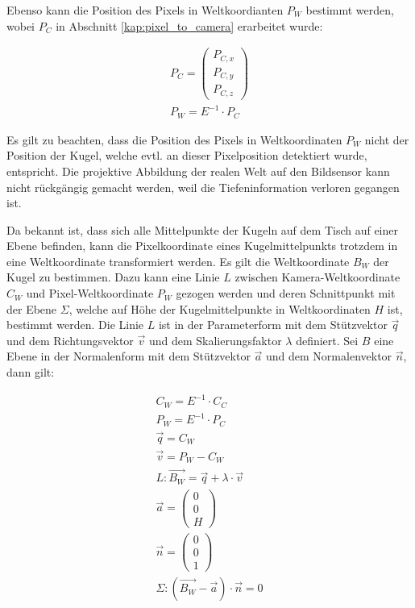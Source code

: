 Ebenso kann die Position des Pixels in Weltkoordianten $P_W$ bestimmt werden, wobei $P_C$
in Abschnitt \ref{kap:pixel_to_camera} erarbeitet wurde:

\begin{align}
P_C = \begin{pmatrix}P_{C,x}\\P_{C,y}\\P_{C,z}\end{pmatrix}\\
P_W = E^{-1} \cdot P_C
\end{align}

Es gilt zu beachten, dass die Position des Pixels in Weltkoordinaten $P_W$ nicht der Position der Kugel, welche evtl. an
dieser Pixelposition detektiert wurde, entspricht. Die projektive Abbildung der realen Welt auf den Bildsensor kann
nicht rückgängig gemacht werden, weil die Tiefeninformation verloren gegangen ist.

Da bekannt ist, dass sich alle Mittelpunkte der Kugeln auf dem Tisch auf einer Ebene befinden, kann die Pixelkoordinate
eines Kugelmittelpunkts trotzdem in eine Weltkoordinate transformiert werden.
Es gilt die Weltkoordinate $B_W$ der Kugel zu bestimmen.
Dazu kann eine Linie $L$ zwischen Kamera-Weltkoordinate $C_W$ und Pixel-Weltkoordinate $P_W$ gezogen werden und deren
Schnittpunkt mit der Ebene $\Sigma$, welche auf Höhe der Kugelmittelpunkte in Weltkoordinaten $H$ ist, bestimmt werden.
Die Linie $L$ ist in der Parameterform mit dem Stützvektor $\vec{q}$ und dem Richtungsvektor $\vec{v}$ und dem Skalierungsfaktor $\lambda$ definiert.
Sei $B$ eine Ebene in der Normalenform mit dem Stützvektor $\vec{a}$ und dem Normalenvektor $\vec{n}$, dann gilt:

\begin{align}
C_W = E^{-1} \cdot C_C\\
P_W = E^{-1} \cdot P_C\\
\vec{q} = C_W\\
\vec{v} = P_W - C_W\\
L: \vec{B_W} = \vec{q} + \lambda \cdot \vec{v}\\
\vec{a} = \begin{pmatrix}0\\0\\H\end{pmatrix}\\
\vec{n} = \begin{pmatrix}0\\0\\1\end{pmatrix}\\
\Sigma: (\vec{B_W} - \vec{a}) \cdot \vec{n} = 0\\
\end{align}

